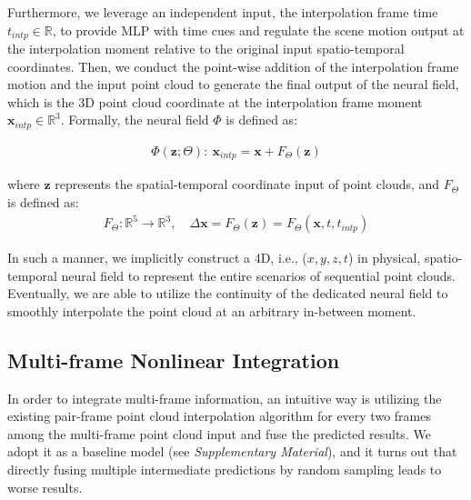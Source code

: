 \documentclass[10pt,twocolumn,letterpaper]{article}
\begin{document}
Furthermore, we leverage an independent input, the interpolation frame time $t_{intp} \in \mathbb{R}$, to provide MLP with time cues and regulate the scene motion output at the interpolation moment relative to the original input spatio-temporal coordinates. Then, we conduct the point-wise addition of the interpolation frame motion and the input point cloud to generate the final output of the neural field, which is the 3D point cloud coordinate at the interpolation frame moment $\mathbf{x}_{intp} \in \mathbb{R}^{3}$. Formally, the neural field $\Phi$ is defined as:
\vspace{-.4cm}



\begin{equation}
\begin{split}
    \Phi \left(\mathbf{z} ; \Theta\right): ~\mathbf{x}_{intp} = \mathbf{x} + F_{\Theta}\left(\mathbf{z}\right)
\end{split}
\end{equation}



\noindent where $\mathbf{z}$ represents the spatial-temporal coordinate input of point clouds, and $F_{\Theta}$ is defined as:
\begin{equation}
\label{eq: MLP}
\begin{split}
    F_{\Theta}: \mathbb{R}^{5} \rightarrow \mathbb{R}^{3},\quad \Delta \mathbf{x} = F_{\Theta}\left(\mathbf{z}\right) = F_{\Theta}\left(\mathbf{x},t,t_{intp}\right)
\end{split}
\end{equation}



In such a manner, we implicitly construct a 4D, i.e., ($x,y,z,t$) in physical, spatio-temporal neural field to represent the entire scenarios of sequential point clouds. Eventually, we are able to utilize the continuity of the dedicated neural field to smoothly interpolate the point cloud at an arbitrary in-between moment.

    
    
\subsection{Multi-frame Nonlinear Integration}
\label{sec: multi-frame nonlinear integration}


In order to integrate multi-frame information, an intuitive way is utilizing the existing pair-frame point cloud interpolation algorithm for every two frames among the multi-frame point cloud input and fuse the predicted results. We adopt it as a baseline model (see \textit{Supplementary Material}), and it turns out that directly fusing multiple intermediate predictions by random sampling leads to worse results. 
\end{document}
